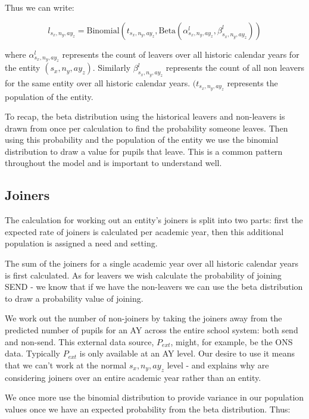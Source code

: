 \documentclass[margin=5mm]{article}
\begin{document}
Thus we can write:

\begin{equation*}
l_{s_x,n_y,ay_z} = \text{Binomial}(t_{s_x,n_y,ay_z},
\text{Beta}(\alpha^l_{s_x,n_y,ay_z}, \beta^l_{s_x,n_y,ay_z}))
\end{equation*}

where $\alpha^l_{s_x,n_y,ay_z}$ represents the count of leavers over
all historic calendar years for the entity $({s_x,n_y,ay_z})$.
Similarly $\beta^l_{s_x,n_y,ay_z}$ represents the count of all non
leavers for the same entity over all historic calendar years.
$(t_{s_x,n_y,ay_z}$ represents the population of the entity.

To recap, the beta distribution using the historical leavers and
non-leavers is drawn from once per calculation to find the probability
someone leaves.  Then using this probability and the population of the
entity we use the binomial distribution to draw a value for pupils
that leave.  This is a common pattern throughout the model and is
important to understand well.

\subsection{Joiners}

The calculation for working out an entity's joiners is split into two
parts: first the expected rate of joiners is calculated per academic
year, then this additional population is assigned a need and setting.

The sum of the joiners for a single academic year over all historic
calendar years is first calculated.  As for leavers we wish calculate
the probability of joining SEND - we know that if we have the
non-leavers we can use the beta distribution to draw a probability
value of joining.

We work out the number of non-joiners by taking the joiners away from
the predicted number of pupils for an AY across the entire school
system: both send and non-send.  This external data source, $P_{ext}$,
might, for example, be the ONS data.  Typically $P_{ext}$ is only
available at an AY level.  Our desire to use it means that we can't
work at the normal ${s_x,n_y,ay_z}$ level - and explains why are
considering joiners over an entire academic year rather than an entity.

We once more use the binomial distribution to provide variance in
our population values once we have an expected probability from the
beta distribution.  Thus:
\end{document}
